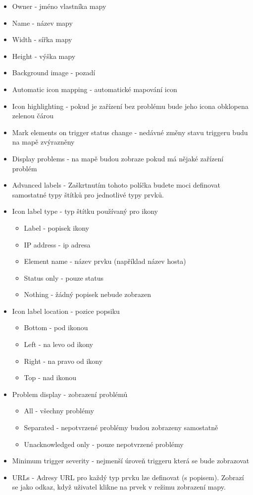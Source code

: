 \documentclass{article}
\begin{document}
\begin{itemize}
        \item Owner -  jméno vlastníka mapy
        \item Name - název mapy
        \item Width - sířka mapy
        \item Height - výška mapy
        \item Background image - pozadí
        \item Automatic icon mapping  - automatické mapování icon
        \item Icon highlighting - pokud je zařízení bez problému bude jeho icona obklopena zelenou čárou
        \item Mark elements on trigger status change - nedávné změny stavu triggeru budu na mapě zvýrazněny
        \item Display problems - na mapě budou zobraze pokud má nějaké zařízení problém
        \item Advanced labels - Zaškrtnutím tohoto políčka budete moci definovat samostatné typy štítků pro jednotlivé typy prvků.
        \item Icon label type - typ štítku používaný pro ikony \begin{itemize}
            \item Label - popisek ikony
            \item IP address - ip adresa
            \item Element name - název prvku (například název hosta)
            \item Status only - pouze status
            \item Nothing - žádný popisek nebude zobrazen
        \end{itemize}
        \item Icon label location - pozice popsiku
        \begin{itemize}
            \item Bottom - pod ikonou 
            \item Left - na levo od ikony
            \item Right  - na pravo od ikony
            \item Top  - nad ikonou
        \end{itemize}
        \item Problem display - zobrazení problémů
        \begin{itemize}
            \item All  - všechny problémy 
            \item Separated  - nepotvrzené problémy budou zobrazeny samostatně
            \item Unacknowledged only  - pouze nepotvrzené problémy
        \end{itemize}
        \item Minimum trigger severity - nejmenší úroveň triggeru která se bude zobrazovat
        \item URLs - Adresy URL pro každý typ prvku lze definovat (s popisem). Zobrazí se jako odkaz, když uživatel klikne na prvek v režimu zobrazení mapy.
    \end{itemize}
\end{document}
